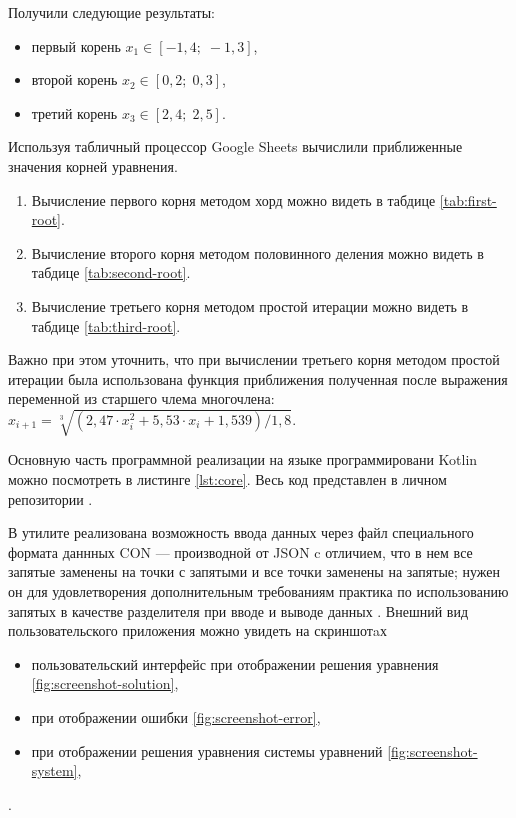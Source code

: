 Получили следующие результаты: \begin{itemize}
    \item первый корень $x_1 \in [-1,4;\; -1,3]$,
    \item второй корень $x_2 \in [0,2;\; 0,3]$,
    \item третий корень $x_3 \in [2,4;\; 2,5]$.
\end{itemize}
Используя табличный процессор Google Sheets вычислили приближенные значения корней уравнения.
\begin{enumerate}
    \item Вычисление первого корня методом хорд можно видеть в табдице \ref{tab:first-root}.
    \item Вычисление второго корня методом половинного деления можно видеть в табдице \ref{tab:second-root}.
    \item Вычисление третьего корня методом простой итерации можно видеть в табдице \ref{tab:third-root}.
\end{enumerate}
Важно при этом уточнить, что при вычислении третьего корня методом простой итерации была использована функция приближения полученная после выражения переменной из старшего члема многочлена: $x_{i+1} = \sqrt[3]{(2,47 \cdot x_i^2 + 5,53 \cdot x_i + 1,539)/1,8}$.




Основную часть программной реализации на языке программировани Kotlin можно посмотреть в листинге \ref{lst:core}. Весь код представлен в личном репозитории \cite{itmocompmath}.


В утилите реализована возможность ввода данных через файл специального формата даннных CON --- производной от JSON c отличием, что в нем все запятые заменены на точки с запятыми и все точки заменены на запятые; нужен он для удовлетворения дополнительным требованиям практика по использованию запятых в качестве разделителя при вводе и выводе данных \cite{wikicommas}. Внешний вид пользовательского приложения можно увидеть на скриншотaх \begin{itemize}
    \item пользовательский интерфейс при отображении решения уравнения \ref{fig:screenshot-solution},
    \item при отображении ошибки \ref{fig:screenshot-error},
    \item при отображении решения уравнения системы уравнений \ref{fig:screenshot-system},
\end{itemize}.

